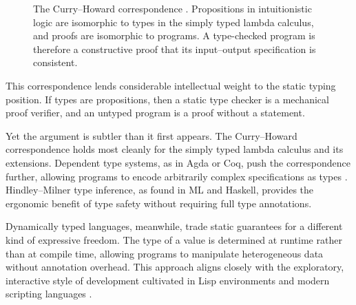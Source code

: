 \documentclass[11pt]{article}
\theoremstyle{definition}
\begin{document}
\begin{figure}[ht]
\centering
{}
\caption{The Curry--Howard correspondence \cite{pierce2002}. Propositions
in intuitionistic logic are isomorphic to types in the simply typed
lambda calculus, and proofs are isomorphic to programs. A type-checked
program is therefore a constructive proof that its input--output
specification is consistent.}
\label{fig:curry_howard}
\end{figure}

This correspondence lends considerable intellectual weight to the
static typing position. If types are propositions, then a static type
checker is a mechanical proof verifier, and an untyped program is a
proof without a statement.

Yet the argument is subtler than it first appears. The Curry--Howard
correspondence holds most cleanly for the simply typed lambda calculus
and its extensions. Dependent type systems, as in Agda or Coq, push the
correspondence further, allowing programs to encode arbitrarily complex
specifications as types \cite{pierce2002}. Hindley--Milner type
inference, as found in ML and Haskell, provides the ergonomic benefit
of type safety without requiring full type annotations.

Dynamically typed languages, meanwhile, trade static guarantees for a
different kind of expressive freedom. The type of a value is determined
at runtime rather than at compile time, allowing programs to manipulate
heterogeneous data without annotation overhead. This approach aligns
closely with the exploratory, interactive style of development
cultivated in Lisp environments and modern scripting languages
\cite{stallman2002}.
\end{document}
